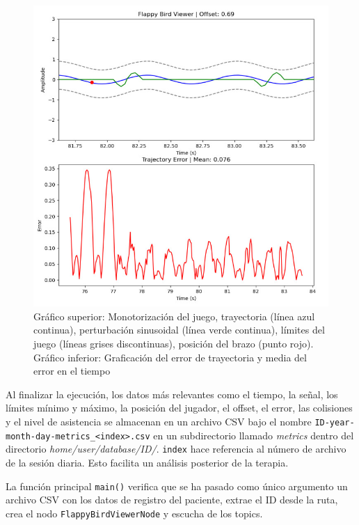 \begin{figure}[ht!]
	\centering
	\begin{minipage}{0.80\linewidth}
		\centering
		\includegraphics[width=\linewidth]{figs/visual.png}
	\end{minipage}
	\caption[Interfaz de visualización del terapeuta]{Gráfico superior: Monotorización del juego, trayectoria (línea azul continua), perturbación sinusoidal (línea verde continua), límites del juego (líneas grises discontinuas), posición del brazo (punto rojo).
	Gráfico inferior: Graficación del error de trayectoria y media del error en el tiempo}
	\label{fig:visual}
\end{figure}

Al finalizar la ejecución, los datos más relevantes como el tiempo, la señal, los límites mínimo y máximo, la posición del jugador, el offset, el error, las colisiones y el nivel de asistencia se almacenan en un archivo CSV bajo el nombre \verb|ID-year-month-day-metrics_<index>.csv| en un subdirectorio llamado \textit{metrics} dentro del directorio \textit{home/user/database/ID/}.
\verb|index| hace referencia al número de archivo de la sesión diaria.
Esto facilita un análisis posterior de la terapia.

La función principal \verb|main()| verifica que se ha pasado como único argumento un archivo CSV con los datos de registro del paciente, extrae el ID desde la ruta, crea el nodo \verb|FlappyBirdViewerNode| y escucha de los topics.

